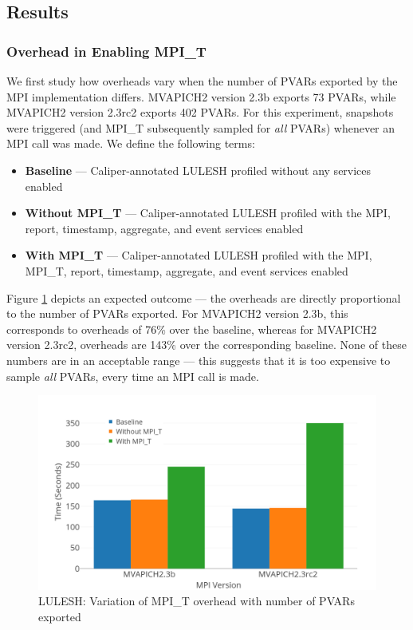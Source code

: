 \subsection{Results}
\subsubsection{Overhead in Enabling MPI\_T}
We first study how overheads vary when the number of PVARs exported by the MPI implementation differs. MVAPICH2 version 2.3b exports 73 PVARs, while MVAPICH2 version 2.3rc2 exports 402 PVARs. For this experiment, snapshots were triggered (and MPI\_T subsequently sampled for \textit{all} PVARs) whenever an MPI call was made. We define the following terms:
\begin{itemize}
\item \textbf{Baseline} --- Caliper-annotated LULESH profiled without any services enabled
\item \textbf{Without MPI\_T} --- Caliper-annotated LULESH profiled with the MPI, report, timestamp, aggregate, and event services enabled
\item \textbf{With MPI\_T} --- Caliper-annotated LULESH profiled with the MPI, MPI\_T, report, timestamp, aggregate, and event services enabled
\end{itemize}
Figure \ref{fig:cali-overhead-version} depicts an expected outcome --- the overheads are directly proportional to the number of PVARs exported. For MVAPICH2 version 2.3b, this corresponds to overheads of 76\% over the baseline, whereas for MVAPICH2 version 2.3rc2, overheads are 143\% over the corresponding baseline. None of these numbers are in an acceptable range --- this suggests that it is too expensive to sample \textit{all} PVARs, every time an MPI call is made.
\begin{center}
	\begin{figure}[bp!]
         \centering
  \captionsetup{justification=centering}
		\includegraphics[scale=0.8, width=\columnwidth, keepaspectratio]{figures/CALIPER_overheads_version}
		\caption{LULESH: Variation of MPI\_T overhead with number of PVARs exported}
		\label{fig:cali-overhead-version}
	\end{figure}
\end{center}


